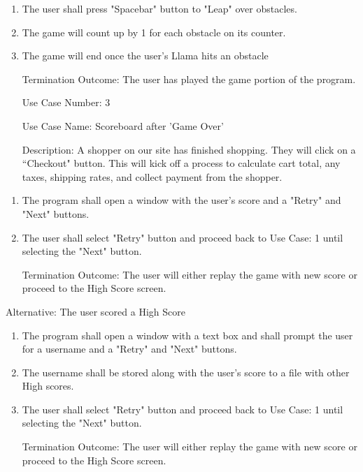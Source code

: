 \documentclass[10pt,conference,onecolumn,compsoc]{IEEEtran}
\begin{document}
\begin{enumerate}
\item The user shall press "Spacebar" button to "Leap" over obstacles.
\item The game will count up by 1 for each obstacle on its counter.
\item The game will end once the user's Llama hits an obstacle
\item[Termination Outcome:] The user has played the game portion of the program.
\end{enumerate}


\begin{itemize}
\item[Use Case Number:] 3
\item[Use Case Name:] Scoreboard after 'Game Over'
\item[Description:] A shopper on our site has finished shopping.  They will click on a ``Checkout" button.  This will kick off a process to calculate cart total, any taxes, shipping rates, and collect payment from the shopper.

\end{itemize}

\begin{enumerate}
\item The program shall open a window with the user's score and a "Retry" and "Next" buttons.
\item The user shall select "Retry" button and proceed back to Use Case: 1 until selecting the "Next" button.
\item[Termination Outcome:] The user will either replay the game with new score or proceed to the High Score screen.
\end{enumerate}

Alternative: The user scored a High Score
\begin{enumerate}
\item The program shall open a window with a text box and shall prompt the user for a username and a "Retry" and "Next" buttons.
\item The username shall be stored along with the user's score to a file with other High scores.
\item The user shall select "Retry" button and proceed back to Use Case: 1 until selecting the "Next" button.
\item[Termination Outcome:] The user will either replay the game with new score or proceed to the High Score screen.
\end{enumerate}
\end{document}
